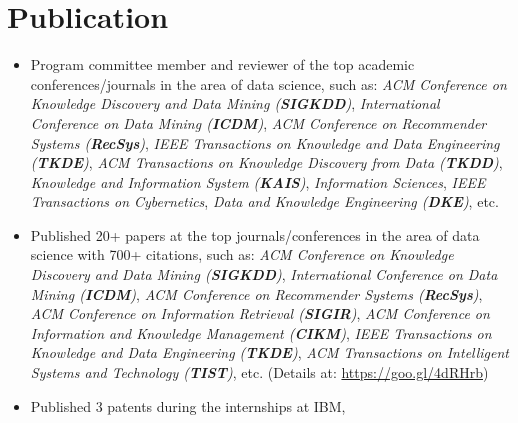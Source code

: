 \documentclass[11pt,a4paper,sans]{moderncv}
\begin{document}

\section{Publication}
\begin{itemize} \itemsep 0.1in
\item Program committee member and reviewer of the top academic conferences/journals in the area of data science, such as: \textit{ACM Conference on Knowledge Discovery and Data Mining (\textbf{SIGKDD})}, \textit{International Conference on Data Mining (\textbf{ICDM})}, \textit{ACM Conference on Recommender Systems (\textbf{RecSys})}, \textit{IEEE Transactions on Knowledge and Data Engineering (\textbf{TKDE})}, \textit{ACM Transactions on Knowledge Discovery from Data (\textbf{TKDD})}, \textit{Knowledge and Information System (\textbf{KAIS})}, \textit{Information Sciences}, \textit{IEEE Transactions on Cybernetics}, \textit{Data and Knowledge Engineering (\textbf{DKE})}, etc.
\item Published 20+ papers at the top journals/conferences in the area of data science with 700+ citations, such as: \textit{ACM Conference on Knowledge Discovery and Data Mining (\textbf{SIGKDD})}, \textit{International Conference on Data Mining (\textbf{ICDM})}, \textit{ACM Conference on Recommender Systems (\textbf{RecSys})}, \textit{ACM Conference on Information Retrieval (\textbf{SIGIR})}, \textit{ACM Conference on Information and Knowledge Management (\textbf{CIKM})}, \textit{IEEE Transactions on Knowledge and Data Engineering (\textbf{TKDE})}, \textit{ACM Transactions on Intelligent Systems and Technology (\textbf{TIST})}, etc. (Details at: \url{https://goo.gl/4dRHrb})
\item Published 3 patents during the internships at IBM,

\end{itemize}
\end{document}
